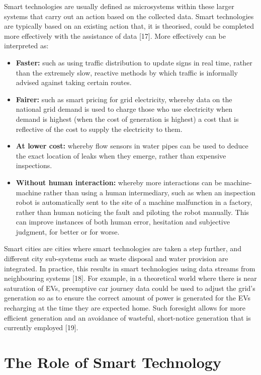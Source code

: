 \documentclass[conference]{IEEEtran}
\begin{document}
Smart technologies are usually defined as microsystems within these
larger systems that carry out an action based on the collected
data. Smart technologies are typically based on an existing action
that, it is theorised, could be completed more effectively with the
assistance of data [17]. More effectively can be interpreted as:

\begin{itemize}
\item {\textbf{Faster:}} such as using traffic distribution to update
  signs in real time, rather than the extremely slow, reactive methods
  by which traffic is informally advised against taking certain
  routes.
\item {\textbf{Fairer:}} such as smart pricing for grid electricity,
  whereby data on the national grid demand is used to charge those who
  use electricity when demand is highest (when the cost of generation
  is highest) a cost that is reflective of the cost to supply the
  electricity to them. 
\item {\textbf{At lower cost:}} whereby flow sensors in water pipes
  can be used to deduce the exact location of leaks when they emerge,
  rather than expensive inspections.
\item {\textbf{Without human interaction:}} whereby more interactions
  can be machine-machine rather than using a human intermediary, such
  as when an inspection robot is automatically sent to the site of a
  machine malfunction in a factory, rather than human noticing the
  fault and piloting the robot manually. This can improve instances of
  both human error, hesitation and subjective judgment, for better or
  for worse. 
\end{itemize}

Smart cities are cities where smart technologies are taken a step
further, and different city sub-systems such as waste disposal and
water provision are integrated. In practice, this results in smart
technologies using data streams from neighbouring systems [18]. For
example, in a theoretical world where there is near saturation of EVs,
preemptive car journey data could be used to adjust the grid’s
generation so as to ensure the correct amount of power is generated
for the EVs recharging at the time they are expected home. Such
foresight allows for more efficient generation and an avoidance of
wasteful, short-notice generation that is currently employed [19].

\section{The Role of Smart Technology}
\end{document}

